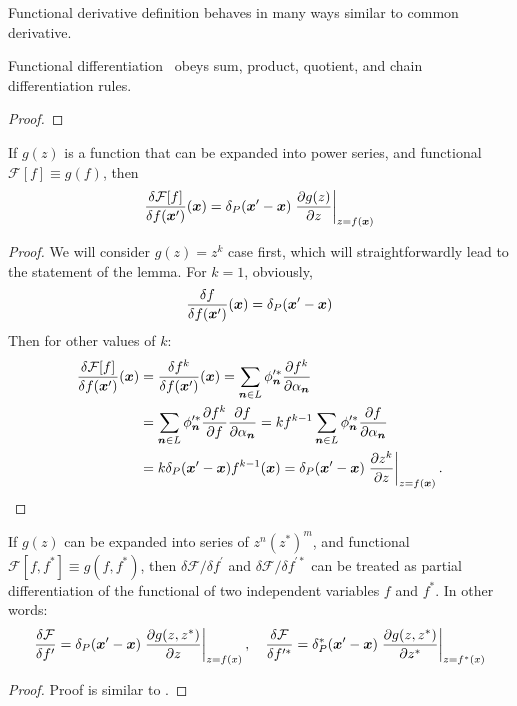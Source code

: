 Functional derivative definition behaves in many ways similar to common derivative.
\begin{lemma}
Functional differentiation~ obeys sum, product, quotient, and chain differentiation rules.
\end{lemma}
\begin{proof}
\end{proof}

\begin{lemma}
If $g(z)$ is a function that can be expanded into power series,
and functional $\mathcal{F}[f] \equiv g(f)$, then
\[
	\frac{\delta \mathcal{F}[f]}{\delta f(\boldsymbol{x}^\prime)} (\boldsymbol{x})
	= \delta_P(\boldsymbol{x}^\prime - \boldsymbol{x})
		\left. \frac{\partial g(z)}{\partial z} \right|_{z = f(\boldsymbol{x})}
\]
\end{lemma}
\begin{proof}
We will consider $g(z) = z^k$ case first, which will straightforwardly lead to the statement of the lemma.
For $k = 1$, obviously,
\[
	\frac{\delta f}{\delta f(\boldsymbol{x}^\prime)} (\boldsymbol{x})
	= \delta_P(\boldsymbol{x}^\prime - \boldsymbol{x})
\]
Then for other values of $k$:
\begin{equation*}
\begin{split}
	\frac{\delta \mathcal{F}[f]}{\delta f(\boldsymbol{x}^\prime)} (\boldsymbol{x})
	& = \frac{\delta f^k}{\delta f(\boldsymbol{x}^\prime)} (\boldsymbol{x})
	= \sum_{\boldsymbol{n} \in L} \phi_{\boldsymbol{n}}^{\prime*}
		\frac{\partial f^k}{\partial \alpha_{\boldsymbol{n}}} \\
	& = \sum_{\boldsymbol{n} \in L} \phi_{\boldsymbol{n}}^{\prime*}
		\frac{\partial f^k}{\partial f}
		\frac{\partial f}{\partial \alpha_{\boldsymbol{n}}}
	= k f^{k-1}
		\sum_{\boldsymbol{n} \in L} \phi_{\boldsymbol{n}}^{\prime*}
		\frac{\partial f}{\partial \alpha_{\boldsymbol{n}}} \\
	& = k \delta_P(\boldsymbol{x}^\prime - \boldsymbol{x}) f^{k-1}(\boldsymbol{x})
	= \delta_P(\boldsymbol{x}^\prime - \boldsymbol{x})
		\left. \frac{\partial z^k}{\partial z} \right|_{z = f(\boldsymbol{x})}.
	\qedhere
\end{split}
\end{equation*}
\end{proof}

\begin{lemma}
If $g(z)$ can be expanded into series of $z^n (z^*)^m$,
and functional $\mathcal{F}[f, f^*] \equiv g(f, f^*)$,
then $\delta \mathcal{F} / \delta f^\prime$ and $\delta \mathcal{F} / \delta f^{\prime*}$ can be treated as partial differentiation of the functional of two independent variables $f$ and $f^*$.
In other words:
\[
	\frac{\delta \mathcal{F}}{\delta f^\prime}
	= \delta_P(\boldsymbol{x}^\prime - \boldsymbol{x}) \left.
		\frac{\partial g(z, z^*)}{\partial z}
	\right|_{z=f(x)},
	\quad
	\frac{\delta \mathcal{F}}{\delta f^{\prime*}}
	= \delta_P^*(\boldsymbol{x}^\prime - \boldsymbol{x}) \left.
		\frac{\partial g(z, z^*)}{\partial z^*}
	\right|_{z=f^*(x)}
\]
\end{lemma}
\begin{proof}
Proof is similar to .
\end{proof}

